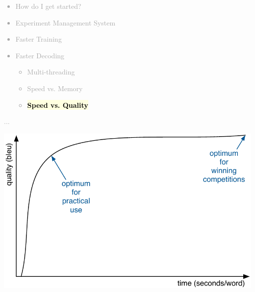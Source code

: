 \documentclass[landscape]{uedslides2C}
\newcommand{\currenttopic}[1]{\colorbox{lightyellow}{\textcolor{black}{\bf #1}}}
\begin{document}

\vspace{-5mm}
\textcolor{darkgrey}{
\begin{itemize} \itemsep -1mm
\item {How do I get started?}
\item {Experiment Management System}
\item {Faster Training}
\item {Faster Decoding}
  \begin{itemize}
  \item {Multi-threading}
  \item {Speed vs. Memory}
  \item \currenttopic{Speed vs. Quality}
  \end{itemize}
\end{itemize}
...
}



\vspace{5mm}
\begin{center} 
\includegraphics[scale=1.4]{quality-vs-speed.pdf}\vspace{-20mm}
\end{center}

\end{document}
